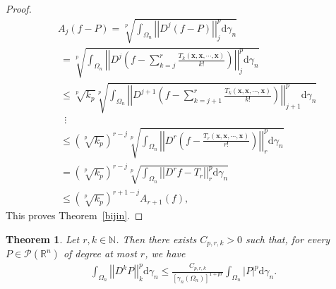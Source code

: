 \documentclass[12pt]{article}
\theoremstyle{plain}
\newtheorem{theorem}{Theorem}[section]
\theoremstyle{definition}
\theoremstyle{remark}
\numberwithin{equation}{section}
\begin{document}
\begin{proof}
$$\begin{aligned}
	&A_{j}\left( f-P \right) =\sqrt[p]{\int_{\Omega_{n}} \left| \left| D^{j}\left( f-P \right) \right| \right|_{j}^{p} \mathrm{d} \gamma_{n}}\\ &\  =\sqrt[p]{\int_{\Omega_{n}} \left\vert \left\vert D^{j}\left( f-\sum_{k=j}^{r} \frac{T_{k}\left( \textbf{x} ,\textbf{x} ,\cdots ,\textbf{x} \right)}{k!} \right) \right\vert \right\vert_{j}^{p} \mathrm{d} \gamma_{n}}\\ &\  \leqslant \sqrt[p]{k_{p}} \sqrt[p]{\int_{\Omega_{n}} \left\vert \left\vert D^{j+1}\left( f-\sum_{k=j+1}^{r} \frac{T_{k}\left( \textbf{x} ,\textbf{x} ,\cdots ,\textbf{x} \right)}{k!} \right) \right\vert \right\vert_{j+1}^{p} \mathrm{d} \gamma_{n}}\\ &\  \  \  \vdots\\ &\  \leqslant \left( \sqrt[p]{k_{p}} \right)^{r-j} \sqrt[p]{\int_{\Omega_{n}} \left\vert \left\vert D^{r}\left( f-\frac{T_{r}\left( \textbf{x} ,\textbf{x} ,\cdots ,\textbf{x} \right)}{r!} \right) \right\vert \right\vert_{r}^{p} \mathrm{d} \gamma_{n}}\\ &\  =\left( \sqrt[p]{k_{p}} \right)^{r-j} \sqrt[p]{\int_{\Omega_{n}} \left\vert \left\vert D^{r}f-T_{r} \right\vert \right\vert_{r}^{p} \mathrm{d} \gamma_{n}}\\ &\  \leqslant \left( \sqrt[p]{k_{p}} \right)^{r+1-j} A_{r+1}\left( f \right) ,\end{aligned}$$
This proves Theorem~\ref{bijin}.
\end{proof}
\begin{theorem}\label{weishuguanguji}
	Let $r,k\in \mathbb{N}$. Then there exists $C_{p,r,k}>0$ such that, for every $P\in \mathcal{P} \left( \mathbb{R}^{n} \right)$ of degree at most $r$, we have
	\begin{eqnarray}
	\int_{\Omega_{n}} \left| \left| D^{k}P \right| \right|_{k}^{p} \mathrm{d} \gamma_{n} \leqslant \frac{C_{p,r,k}}{[\gamma_n(\Omega_n)]^{1+pr}} \int_{\Omega_{n}} \left| P \right|^{p} \mathrm{d} \gamma_{n}.\label{1fff13f}
	\end{eqnarray}
\end{theorem}
\end{document}
